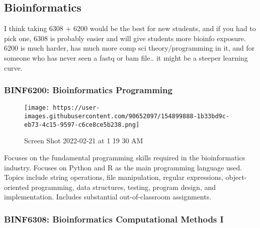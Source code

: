 \documentclass[
  letterpaper,
  DIV=11,
  numbers=noendperiod]{scrreprt}
\begin{document}
\hypertarget{bioinformatics}{%
\subsection*{\texorpdfstring{\textbf{Bioinformatics}}{Bioinformatics}}\label{bioinformatics}}

I think taking 6308 + 6200 would be the best for new students, and if
you had to pick one, 6308 is probably easier and will give students more
bioinfo exposure. 6200 is much harder, has much more comp sci
theory/programming in it, and for someone who has never seen a fastq or
bam file.. it might be a steeper learning curve.

\hypertarget{binf6200-bioinformatics-programming}{%
\subsubsection*{\texorpdfstring{\textbf{BINF6200: Bioinformatics
Programming}}{BINF6200: Bioinformatics Programming}}\label{binf6200-bioinformatics-programming}}

\begin{figure}

{\centering \texttt{[image: https://user-images.githubusercontent.com/90652097/154899888-1b33bd9c-eb73-4c15-9597-c6ce8ce5b238.png]}

}

\caption{Screen Shot 2022-02-21 at 1 19 30 AM}

\end{figure}

Focuses on the fundamental programming skills required in the
bioinformatics industry. Focuses on Python and R as the main programming
language used. Topics include string operations, file manipulation,
regular expressions, object-oriented programming, data structures,
testing, program design, and implementation. Includes substantial
out-of-classroom assignments.

\hypertarget{binf6308-bioinformatics-computational-methods-i}{%
\subsubsection*{\texorpdfstring{\textbf{BINF6308: Bioinformatics
Computational Methods
I}}{BINF6308: Bioinformatics Computational Methods I}}\label{binf6308-bioinformatics-computational-methods-i}}
\end{document}
